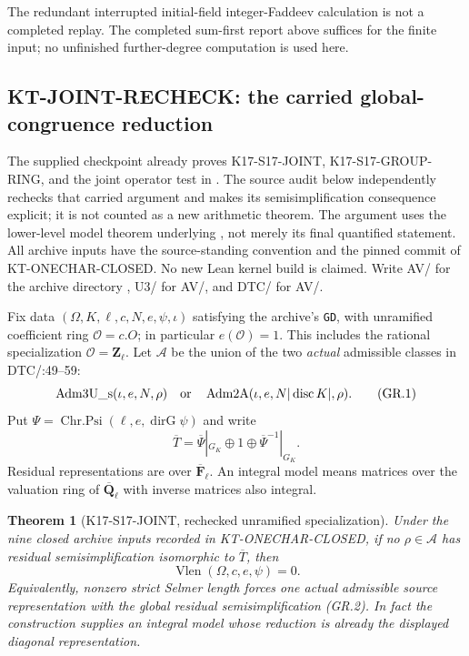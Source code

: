 \documentclass[11pt,a4paper]{article}
\newtheorem{theorem}{Theorem}[section]
\theoremstyle{definition}
\begin{document}
The redundant interrupted initial-field integer-Faddeev
calculation is not a completed replay.  The completed
sum-first report above suffices for the finite input;
no unfinished further-degree computation is used here.



\subsection{KT-JOINT-RECHECK: the carried global-congruence reduction}
\label{sec:kt-global-residual}

The supplied checkpoint already proves K17-S17-JOINT,
K17-S17-GROUP-RING, and the joint operator test in
.
The source audit below independently rechecks that carried
argument and makes its semisimplification consequence explicit;
it is not counted as a new arithmetic theorem. The argument
uses the lower-level model theorem underlying
, not merely its final quantified statement.
All archive inputs have the source-standing convention and the
pinned commit of KT-ONECHAR-CLOSED. No new Lean kernel build is
claimed. Write AV/ for the archive directory
,
U3/ for AV/, and DTC/ for
AV/.

Fix data $(\Omega,K,\ell,c,N,e,\psi,\iota)$ satisfying the
archive's \texttt{GD}, with unramified coefficient ring
$\mathcal O=c.O$; in particular $e(\mathcal O)=1$.
This includes the rational specialization $\mathcal O=\mathbf Z_\ell$.
Let $\mathscr A$ be the union of the two \emph{actual} admissible
classes in DTC/:49--59:
\[
 \operatorname{Adm3U\_s}(\iota,e,N,\rho)
 \quad\hbox{or}\quad
 \operatorname{Adm2A}(\iota,e,N|\operatorname{disc}K|,\rho).
                                                               \tag{GR.1}
\]
Put $\Psi=\operatorname{Chr.Psi}(\ell,e,\operatorname{dirG}\psi)$
and write
\[
 \overline T=\overline\Psi|_{G_K}\oplus1
                    \oplus\overline\Psi^{-1}|_{G_K}.
                                                               \tag{GR.2}
\]
Residual representations are over $\overline{\mathbf F}_\ell$.
An integral model means matrices over the valuation ring of
$\overline{\mathbf Q}_\ell$ with inverse matrices also integral.

\begin{theorem}[K17-S17-JOINT, rechecked unramified specialization]
Under the nine closed archive inputs recorded in
KT-ONECHAR-CLOSED, if no $\rho\in\mathscr A$ has residual
semisimplification isomorphic to $\overline T$, then
\[
                   \operatorname{Vlen}(\Omega,c,e,\psi)=0.
                                                               \tag{GR.3}
\]
Equivalently, nonzero strict Selmer length forces one actual
admissible source representation with the global residual
semisimplification (GR.2). In fact the construction supplies
an integral model whose reduction is already the displayed
diagonal representation.
\end{theorem}
\end{document}
